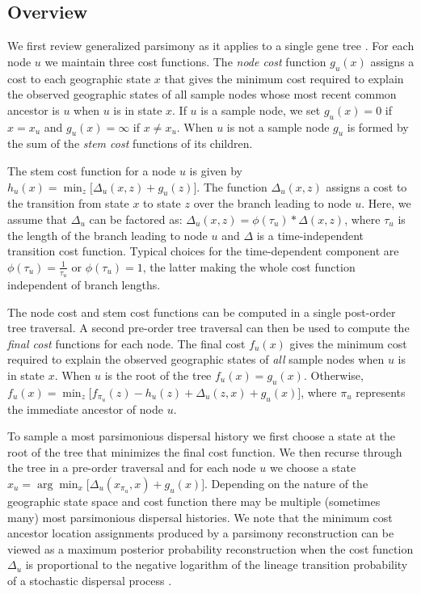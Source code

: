 \subsection{Overview}

We first review generalized parsimony as it applies to a single gene tree
\cite{Sankoff_1975, Sankoff_Rousseau_1975}. For each node $u$ we maintain
three cost functions. The \textit{node cost} function $g_u(x)$ assigns a cost 
to each geographic state $x$ that gives the minimum cost required to explain 
the observed geographic states of all sample nodes whose most recent common 
ancestor is $u$ when $u$ is in state  $x$. If $u$ is a sample node, we set 
$g_u(x) = 0$ if $x = x_u$ and $g_u(x) = \infty$ if $x \neq x_u$. When $u$ is 
not a sample node $g_u$ is formed by the sum of the \textit{stem cost} 
functions of its children.

The stem cost function for a node $u$ is given by
%
$h_u(x) = \min_z \bigl[ \Delta_u(x, z) + g_u(z) \bigr]$.
%
The function $\Delta_u(x, z)$ assigns a cost to the transition from state $x$ to
state $z$ over the branch leading to node $u$. Here, we assume that $\Delta_u$
can be factored as:
%
$\Delta_u(x,z) = \phi(\tau_u) * \Delta(x,z)$,
%
where $\tau_u$ is the length of the branch leading to node $u$ and $\Delta$ is
a time-independent transition cost function. Typical choices for the
time-dependent component are $\phi(\tau_u) = \frac{1}{\tau_u}$ or 
$\phi(\tau_u) = 1$, the latter making the whole cost function independent of
branch lengths.

The node cost and stem cost functions can be computed in a single post-order
tree traversal. A second pre-order tree traversal can then be used to compute
the \textit{final cost} functions for each node. The final cost $f_u(x)$
gives the minimum cost required to explain the observed geographic states of
\emph{all} sample nodes when $u$ is in state $x$. When $u$ is the root of the
tree $f_u(x) = g_u(x)$. Otherwise, 
%
$f_u(x) = \min_z \bigl[ f_{\pi_u}(z) - h_u(z) + \Delta_u(z,x) + g_u(x) \bigr]$,
%
where $\pi_u$ represents the immediate ancestor of node $u$.

To sample a most parsimonious dispersal history we first choose a state at the
root of the tree that minimizes the final cost function. We then recurse through 
the tree in a pre-order traversal and for each node $u$ we choose a state
$x_u = \arg\min_x \bigl[\Delta_u(x_{\pi_u}, x) + g_u(x)\bigr]$. Depending on the
nature of the geographic state space and cost function there may be multiple
(sometimes many) most parsimonious dispersal histories. We note that the 
minimum cost ancestor location assignments produced by a parsimony 
reconstruction can be viewed as a maximum posterior probability reconstruction 
when the cost function $\Delta_u$ is proportional to the negative logarithm of 
the lineage transition probability of a stochastic dispersal process 
\cite{Maddison_1991}.


